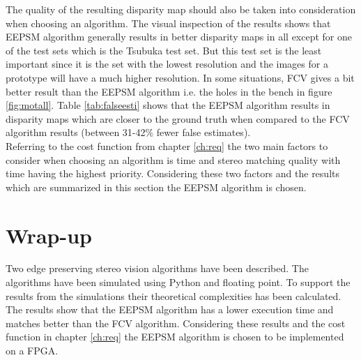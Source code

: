 The quality of the resulting disparity map should also be taken into consideration when choosing an algorithm. The visual inspection of the results shows that EEPSM algorithm generally results in better disparity maps in all except for one of the test sets which is the Tsubuka test set. But this test set is the least important since it is the set with the lowest resolution and the images for a prototype will have a much higher resolution. In some situations, FCV gives a bit better result than the EEPSM algorithm i.e. the holes in the bench in figure \vref{fig:motall}. Table \vref{tab:falseesti} shows that the EEPSM algorithm results in disparity maps which are closer to the ground truth when compared to the FCV algorithm results (between 31-42\% fewer false estimates).\\

Referring to the cost function from chapter \ref{ch:req} the two main factors to consider when choosing an algorithm is time and stereo matching quality with time having the highest priority. Considering these two factors and the results which are summarized in this section the EEPSM algorithm is chosen.

\section{Wrap-up}
Two edge preserving stereo vision algorithms have been described. The algorithms have been simulated using Python and floating point. To support the results from the simulations their theoretical complexities has been calculated. The results show that the EEPSM algorithm has a lower execution time and matches better than the FCV algorithm. Considering these results and the cost function in chapter \ref{ch:req} the EEPSM algorithm is chosen to be implemented on a FPGA. 